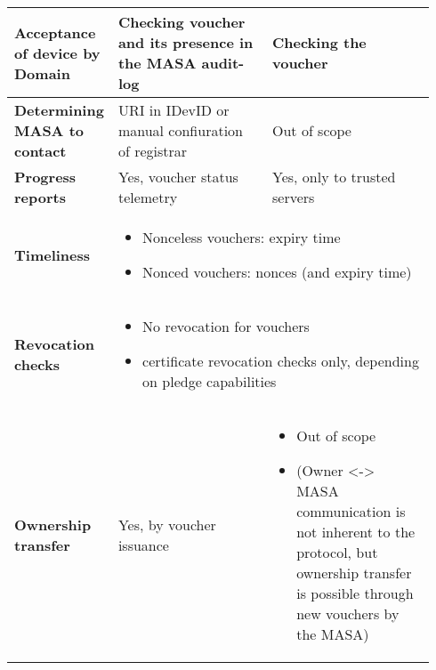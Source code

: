 \begin{longtable}{|m{0.171\linewidth}|m{0.372\linewidth}|m{0.393\linewidth}|}
		\hline
		\rowcolor[rgb]{ .745,  .804,  .843} \textbf{Acceptance of device by Domain} & \multicolumn{1}{p{18.335em}|}{\cellcolor[rgb]{ 1,  1,  1}Checking voucher and its presence in the MASA audit-log} & \cellcolor[rgb]{ 1,  1,  1}Checking the voucher \bigstrut\\

		\hline
		\rowcolor[rgb]{ .745,  .804,  .843} \textbf{Determining MASA to contact} & \multicolumn{1}{p{18.335em}|}{\cellcolor[rgb]{ 1,  1,  1}URI in IDevID or manual confiuration of registrar} & \cellcolor[rgb]{ 1,  1,  1}Out of scope \bigstrut\\

		\hline
		\rowcolor[rgb]{ .745,  .804,  .843} \textbf{Progress reports} & \cellcolor[rgb]{ 1,  1,  1}Yes, voucher status telemetry & \cellcolor[rgb]{ 1,  1,  1}Yes, only to trusted servers \bigstrut\\

		\hline
		\rowcolor[rgb]{ .745,  .804,  .843} \textbf{Timeliness} & \multicolumn{2}{p{36.67em}|}{\cellcolor[rgb]{ 1,  1,  1}
		\begin{itemize}[leftmargin=*, topsep=0pt, noitemsep]
		\item
			Nonceless vouchers: expiry time
		\item
			Nonced vouchers: nonces (and expiry time)
		\end{itemize}
		} \bigstrut\\

		\hline
		\rowcolor[rgb]{ .745,  .804,  .843} \textbf{Revocation checks} & \multicolumn{2}{p{36.67em}|}{\cellcolor[rgb]{ 1,  1,  1}
		\begin{itemize}[leftmargin=*, topsep=0pt, noitemsep]
		\item
			No revocation for vouchers
		\item
			certificate revocation checks only, depending on pledge capabilities
		\end{itemize}
		 } \bigstrut\\

		\hline
		\rowcolor[rgb]{ .745,  .804,  .843} \textbf{Ownership transfer} & \cellcolor[rgb]{ 1,  1,  1}Yes, by voucher issuance & \multicolumn{1}{p{18.335em}|}{\cellcolor[rgb]{ 1,  1,  1}
		\begin{itemize}[leftmargin=*, topsep=0pt, noitemsep]
		\item
			Out of scope
		\item
			(Owner <-> MASA communication is not inherent to the protocol, but ownership transfer is possible through new vouchers by the MASA)
		\end{itemize}
		} \bigstrut\\


\end{longtable}
